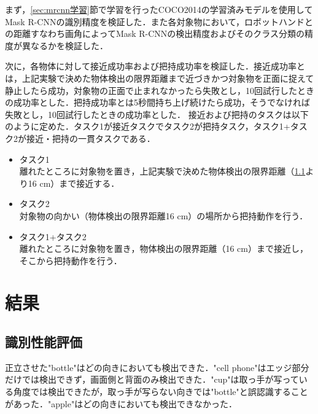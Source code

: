まず，\ref{sec:mrcnn学習}節で学習を行ったCOCO2014の学習済みモデルを使用してMask R-CNNの識別精度を検証した．また各対象物において，ロボットハンドとの距離すなわち画角によってMask R-CNNの検出精度およびそのクラス分類の精度が異なるかを検証した．

次に，各物体に対して接近成功率および把持成功率を検証した．接近成功率とは，上記実験で決めた物体検出の限界距離まで近づきかつ対象物を正面に捉えて静止したら成功，対象物の正面で止まれなかったら失敗とし，10回試行したときの成功率とした．把持成功率とは5秒間持ち上げ続けたら成功，そうでなければ失敗とし，10回試行したときの成功率とした．
接近および把持のタスクは以下のように定めた．タスク1が接近タスクでタスク2が把持タスク，タスク1+タスク2が接近・把持の一貫タスクである．
\begin{itemize}
    \item タスク1\\
    離れたところに対象物を置き，上記実験で決めた物体検出の限界距離（\ref{sec:識別性能評価}より16 cm）まで接近する．
    \item タスク2\\
    対象物の向かい（物体検出の限界距離16 cm）の場所から把持動作を行う．
    \item タスク1+タスク2\\
    離れたところに対象物を置き，物体検出の限界距離（16 cm）まで接近し，そこから把持動作を行う．
\end{itemize}


\section{結果}
\subsection{識別性能評価}\label{sec:識別性能評価}
正立させた"bottle"はどの向きにおいても検出できた．"cell phone"はエッジ部分だけでは検出できず，画面側と背面のみ検出できた．"cup"は取っ手が写っている角度では検出できたが，取っ手が写らない向きでは"bottle"と誤認識することがあった．"apple"はどの向きにおいても検出できなかった．

